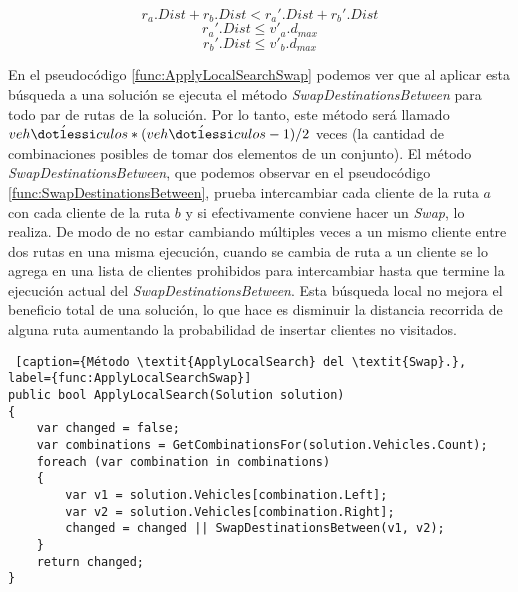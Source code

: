 \begin{equation}\label{eq:swap1}
r_a.Dist + r_b.Dist < r_a'.Dist + r_b'.Dist
\end{equation} 
\begin{equation}\label{eq:swap2}
r_a'.Dist \leq v'_a.d_{max}
\end{equation} 
\begin{equation}\label{eq:swap3}
r_b'.Dist \leq v'_b.d_{max}
\end{equation} 

\bigskip

En el pseudocódigo \ref{func:ApplyLocalSearchSwap} podemos ver que al aplicar esta búsqueda a una solución se ejecuta el método \textit{SwapDestinationsBetween} para todo par de rutas de la solución. Por lo tanto, este método será llamado $veh\acute{\dotlessi}culos * (veh\acute{\dotlessi}culos-1) / 2$ veces (la cantidad de combinaciones posibles de tomar dos elementos de un conjunto). El método \textit{SwapDestinationsBetween}, que podemos observar en el pseudocódigo \ref{func:SwapDestinationsBetween}, prueba intercambiar cada cliente de la ruta $a$ con cada cliente de la ruta $b$ y si efectivamente conviene hacer un \textit{Swap}, lo realiza. De modo de no estar cambiando múltiples veces a un mismo cliente entre dos rutas en una misma ejecución, cuando se cambia de ruta a un cliente se lo agrega en una lista de clientes prohibidos para intercambiar hasta que termine la ejecución actual del \textit{SwapDestinationsBetween}. Esta búsqueda local no mejora el beneficio total de una solución, lo que hace es disminuir la distancia recorrida de alguna ruta aumentando la probabilidad de insertar clientes no visitados.

\bigskip

\begin{minipage}{\textwidth}
\begin{lstlisting} [caption={Método \textit{ApplyLocalSearch} del \textit{Swap}.}, label={func:ApplyLocalSearchSwap}]
public bool ApplyLocalSearch(Solution solution)
{
	var changed = false;
	var combinations = GetCombinationsFor(solution.Vehicles.Count);
	foreach (var combination in combinations)
	{
		var v1 = solution.Vehicles[combination.Left];
		var v2 = solution.Vehicles[combination.Right];
		changed = changed || SwapDestinationsBetween(v1, v2);
	}
	return changed;
}
\end{lstlisting}
\end{minipage}

